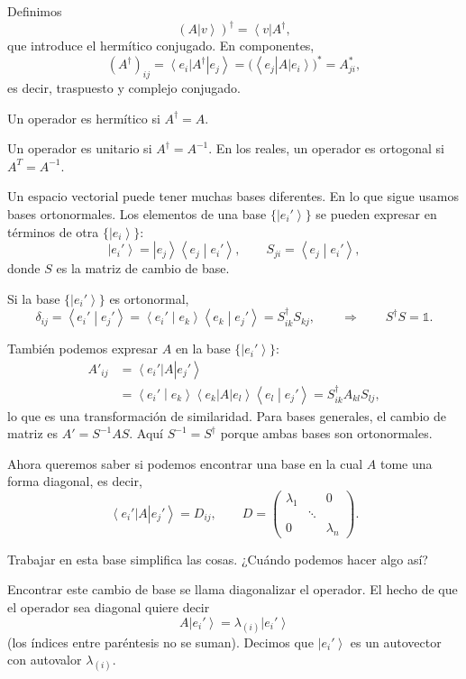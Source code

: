 \documentclass[11pt,a4paper]{article}
\newcommand{\concept}[1]{\textcolor{concept-green}{#1}}
\newcommand{\ket}[1]{\left|#1\right\rangle}
\newcommand{\bra}[1]{\left\langle#1\right|}
\newcommand{\braket}[2]{\left\langle #1\middle|#2\right\rangle}
\begin{document}
Definimos
\[
  (A\ket v)^\dagger=\bra v A^\dagger,
\]
que introduce el hermítico conjugado. En componentes,
\[
  (A^\dagger)_{ij}
  =\bra{e_i}A^\dagger\ket{e_j}
  =\bigl(\bra{e_j}A\ket{e_i}\bigr)^*
  =A_{ji}^*,
\]
es decir, traspuesto y complejo conjugado.

Un operador es \concept{hermítico} si $A^\dagger=A$.

Un operador es \concept{unitario} si $A^\dagger=A^{-1}$. En los reales, un operador es \concept{ortogonal} si $A^T=A^{-1}$.

Un espacio vectorial puede tener muchas bases diferentes. En lo que sigue
usamos bases ortonormales. Los elementos de una base $\{\ket{e_i'}\}$ se pueden
expresar en términos de otra $\{\ket{e_i}\}$:
\[
  \ket{e_i'}=\ket{e_j}\braket{e_j}{e_i'},
  \qquad
  S_{ji}=\braket{e_j}{e_i'},
\]
donde $S$ es la \concept{matriz de cambio de base}.

Si la base $\{\ket{e_i'}\}$ es ortonormal,
\[
  \delta_{ij}
  =\braket{e_i'}{e_j'}
  =\braket{e_i'}{e_k}\braket{e_k}{e_j'}
  =S^\dagger_{ik}S_{kj},
  \qquad\Longrightarrow\qquad
  S^\dagger S=\mathbb{1}.
\]

También podemos expresar $A$ en la base $\{\ket{e_i'}\}$:
\begin{align*}
  A'_{ij}
  &=\bra{e_i'}A\ket{e_j'}\\
  &=\braket{e_i'}{e_k}\bra{e_k}A\ket{e_l}\braket{e_l}{e_j'}
   =S^\dagger_{ik}A_{kl}S_{lj},
\end{align*}
lo que es una \concept{transformación de similaridad}.
Para bases generales, el cambio de matriz es $A'=S^{-1}AS$.
Aquí $S^{-1}=S^\dagger$ porque ambas bases son ortonormales.

Ahora queremos saber si podemos encontrar una base en la cual $A$ tome una forma diagonal, es decir,
\[
  \bra{e_i'}A\ket{e_j'}=D_{ij},
  \qquad
  D=\begin{pmatrix}
    \lambda_1&&0\\
    &\ddots&\\
    0&&\lambda_n
  \end{pmatrix}.
\]

Trabajar en esta base simplifica las cosas. ¿Cuándo podemos hacer algo así?

Encontrar este cambio de base se llama \concept{diagonalizar} el operador. El hecho de que el operador sea diagonal quiere decir
\[
  A\ket{e_i'}=\lambda_{(i)}\ket{e_i'}
\]
(los índices entre paréntesis no se suman). Decimos que $\ket{e_i'}$ es un \concept{autovector} con \concept{autovalor} $\lambda_{(i)}$.
\end{document}
